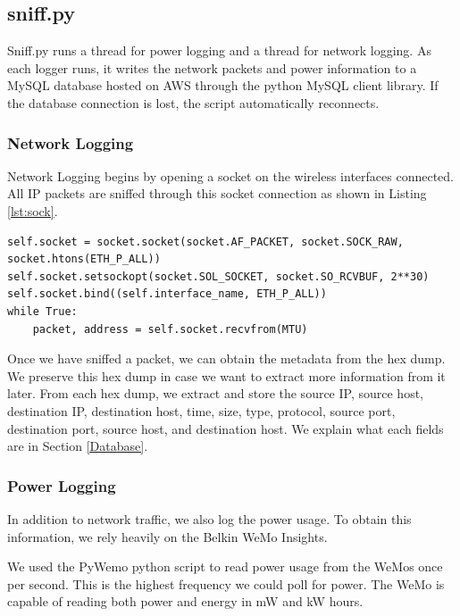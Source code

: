 \subsection{sniff.py}
\label{sniff.py}
Sniff.py runs a thread for power logging and a thread for network logging. As each logger runs, it writes the network packets and power information to a MySQL database hosted on AWS through the python MySQL client \cite{mysqlclient} library. If the database connection is lost, the script automatically reconnects.

\subsubsection{Network Logging}
Network Logging begins by opening a socket on the wireless interfaces connected. All IP packets are sniffed through this socket connection as shown in Listing \ref{lst:sock}.

\noindent
\begin{minipage}{\textwidth}
\begin{lstlisting}[label={lst:sock},caption={Open and Read from a Socket},captionpos=b]
self.socket = socket.socket(socket.AF_PACKET, socket.SOCK_RAW, socket.htons(ETH_P_ALL))
self.socket.setsockopt(socket.SOL_SOCKET, socket.SO_RCVBUF, 2**30)
self.socket.bind((self.interface_name, ETH_P_ALL))
while True:
    packet, address = self.socket.recvfrom(MTU)
\end{lstlisting}
\end{minipage}

Once we have sniffed a packet, we can obtain the metadata from the hex dump. We preserve this hex dump in case we want to extract more information from it later. From each hex dump, we extract and store the source IP, source host, destination IP, destination host, time, size, type, protocol, source port, destination port, source host, and destination host. We explain what each fields are in Section \ref{Database}.

\subsubsection{Power Logging}
In addition to network traffic, we also log the power usage. To obtain this information, we rely heavily on the Belkin WeMo Insights.

We used the PyWemo python script \cite{pywemo} to read power usage from the WeMos once per second. This is the highest frequency we could poll for power. The WeMo is capable of reading both power and energy in mW and kW hours.

